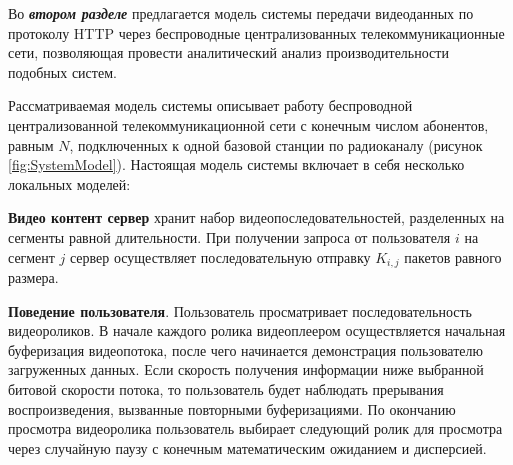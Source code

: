 

Во \textbf{\textit{втором разделе}} предлагается модель системы передачи видеоданных по протоколу HTTP через беспроводные централизованных телекоммуникационные сети, позволяющая провести аналитический анализ производительности подобных систем.

Рассматриваемая модель системы описывает работу беспроводной централизованной телекоммуникационной сети с конечным числом абонентов, равным $N$, подключенных к одной базовой станции по радиоканалу (рисунок \ref{fig:SystemModel}). Настоящая модель системы включает в себя несколько локальных моделей:

\textbf{Видео контент сервер} хранит набор видеопоследовательностей, разделенных на сегменты равной длительности. При получении запроса от пользователя $i$ на сегмент $j$ сервер осуществляет последовательную отправку $K_{i,j}$ пакетов равного размера.

\textbf{Поведение пользователя}. Пользователь просматривает последовательность видеороликов. В начале каждого ролика видеоплеером осуществляется начальная буферизация видеопотока, после чего начинается демонстрация пользователю загруженных данных. Если скорость получения информации ниже выбранной битовой скорости потока, то пользователь будет наблюдать прерывания воспроизведения, вызванные повторными буферизациями. По окончанию просмотра видеоролика пользователь выбирает следующий ролик для просмотра через случайную паузу с конечным математическим ожиданием и дисперсией.

